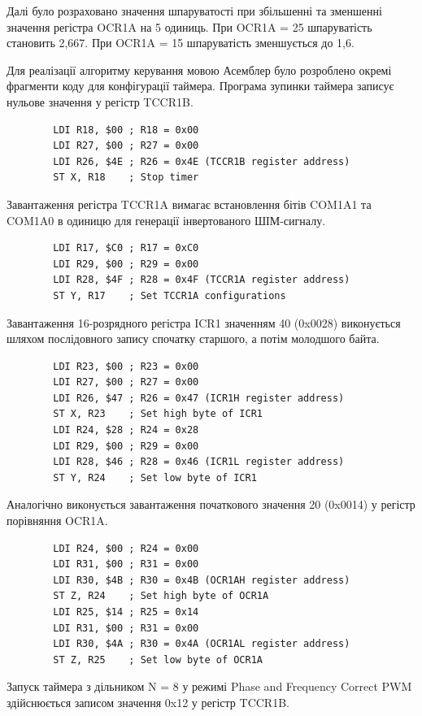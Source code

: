 \documentclass[14pt, a4paper]{extreport}
\begin{document}
	Далі було розраховано значення шпаруватості при збільшенні та зменшенні значення регістра OCR1A на 5 одиниць. При OCR1A = 25 шпаруватість становить 2,667. При OCR1A = 15 шпаруватість зменшується до 1,6.
	
	Для реалізації алгоритму керування мовою Асемблер було розроблено окремі фрагменти коду для конфігурації таймера. Програма зупинки таймера записує нульове значення у регістр TCCR1B.
	
	\begin{verbatim}
		LDI R18, $00 ; R18 = 0x00
		LDI R27, $00 ; R27 = 0x00
		LDI R26, $4E ; R26 = 0x4E (TCCR1B register address)
		ST X, R18    ; Stop timer
	\end{verbatim}
	
	Завантаження регістра TCCR1A вимагає встановлення бітів COM1A1 та COM1A0 в одиницю для генерації інвертованого ШІМ-сигналу.
	
	\begin{verbatim}
		LDI R17, $C0 ; R17 = 0xC0
		LDI R29, $00 ; R29 = 0x00
		LDI R28, $4F ; R28 = 0x4F (TCCR1A register address)
		ST Y, R17    ; Set TCCR1A configurations
	\end{verbatim}
	
	Завантаження 16-розрядного регістра ICR1 значенням 40 (0x0028) виконується шляхом послідовного запису спочатку старшого, а потім молодшого байта.
	
	\begin{verbatim}
		LDI R23, $00 ; R23 = 0x00
		LDI R27, $00 ; R27 = 0x00
		LDI R26, $47 ; R26 = 0x47 (ICR1H register address)
		ST X, R23    ; Set high byte of ICR1
		LDI R24, $28 ; R24 = 0x28
		LDI R29, $00 ; R29 = 0x00
		LDI R28, $46 ; R28 = 0x46 (ICR1L register address)
		ST Y, R24    ; Set low byte of ICR1
	\end{verbatim}
	
	Аналогічно виконується завантаження початкового значення 20 (0x0014) у регістр порівняння OCR1A.
	
	\begin{verbatim}
		LDI R24, $00 ; R24 = 0x00
		LDI R31, $00 ; R31 = 0x00
		LDI R30, $4B ; R30 = 0x4B (OCR1AH register address)
		ST Z, R24    ; Set high byte of OCR1A
		LDI R25, $14 ; R25 = 0x14
		LDI R31, $00 ; R31 = 0x00
		LDI R30, $4A ; R30 = 0x4A (OCR1AL register address)
		ST Z, R25    ; Set low byte of OCR1A
	\end{verbatim}
	
	Запуск таймера з дільником N = 8 у режимі Phase and Frequency Correct PWM здійснюється записом значення 0x12 у регістр TCCR1B.
	
\end{document}
